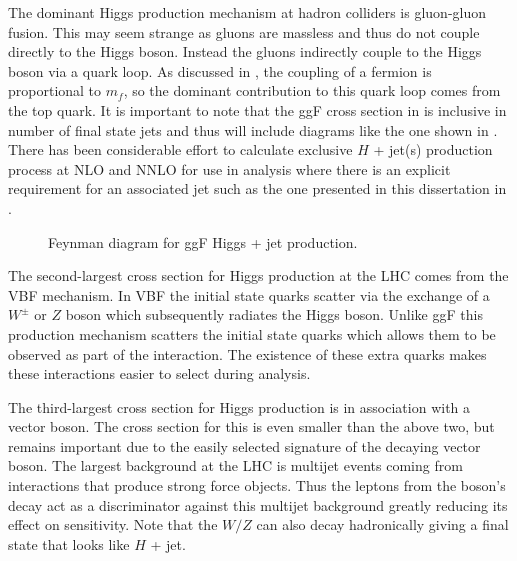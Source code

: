 The dominant Higgs production mechanism at hadron colliders is gluon-gluon
fusion.  This may seem strange as gluons are massless and thus do not couple
directly to the Higgs boson.  Instead the gluons indirectly couple to the Higgs
boson via a quark loop.  As discussed in , the
coupling of a fermion is proportional to $m_f$, so the dominant contribution to
this quark loop comes from the top quark. It is important to note that the ggF
cross section in  is inclusive in number
of final state jets and thus will include diagrams like the one shown in
.  There has been considerable effort to calculate exclusive
$H$ + jet(s) production process at NLO and NNLO \cite{deFlorian:2016spz} for
use in analysis where there is an explicit requirement for an associated jet
such as the one presented in this dissertation in .

\begin{figure}[!htbp]
\centering
{}
\caption{Feynman diagram for ggF Higgs + jet production.}
\label{fig:h_plus_j}
\end{figure}

The second-largest cross section for Higgs production at the LHC comes from the VBF
mechanism.  In VBF the initial state quarks scatter via the exchange of a
$W^{\pm}$ or $Z$ boson which subsequently radiates the Higgs boson.  Unlike ggF
this production mechanism scatters the initial state quarks which allows them to
be observed as part of the interaction.  The existence of these extra quarks
makes these interactions easier to select during analysis.

The third-largest cross section for Higgs production is in association with a
vector boson. The cross section for this is even smaller than the above two, but
remains important due to the easily selected signature of the decaying vector
boson.  The largest background at the LHC is multijet events coming from
interactions that produce strong force objects.  Thus the leptons from the
boson's decay act as a discriminator against this multijet background greatly
reducing its effect on sensitivity. Note that the $W/Z$ can also decay
hadronically giving a final state that looks like $H$ + jet.

